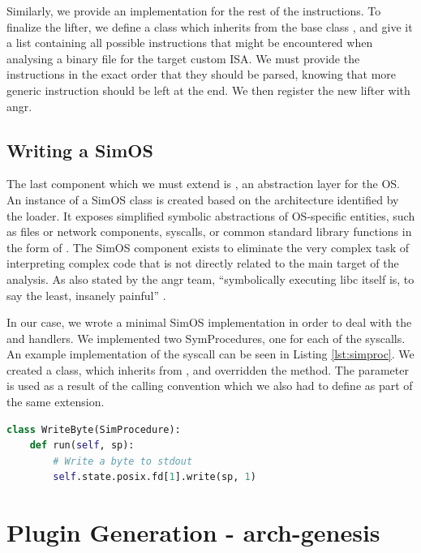 Similarly, we provide an implementation for the rest of the instructions. To finalize the lifter, we define a class which inherits from the base class , and give it a list containing all possible instructions that might be encountered when analysing a binary file for the target custom \gls{ISA}. We must provide the instructions in the exact order that they should be parsed, knowing that more generic instruction should be left at the end. We then register the new lifter with angr.

\subsection{Writing a SimOS}

The last component which we must extend is , an abstraction layer for the \gls{OS}. An instance of a SimOS class is created based on the architecture identified by the loader. It exposes simplified symbolic abstractions of \gls{OS}-specific entities, such as files or network components, \glspl{syscall}, or common standard library functions in the form of  \cite{angr_tut}. The SimOS component exists to eliminate the very complex task of interpreting complex code that is not directly related to the main target of the analysis. As also stated by the angr team, ``symbolically executing libc itself is, to say the least, insanely painful'' \cite{angr_tut}. 

In our case, we wrote a minimal SimOS implementation in order to deal with the  and  handlers. We implemented two SymProcedures, one for each of the \glspl{syscall}. An example implementation of the  \gls{syscall} can be seen in Listing \ref{lst:simproc}. We created a class, which inherits from , and overridden the  method. The parameter  is used as a result of the calling convention which we also had to define as part of the same extension.

\begin{lstlisting}[language=python, label={lst:simproc}, caption={A short example of SimProcedure implementing a write instruction.}]
class WriteByte(SimProcedure):
    def run(self, sp):
        # Write a byte to stdout
        self.state.posix.fd[1].write(sp, 1) 
\end{lstlisting}

\section{Plugin Generation - arch-genesis}

